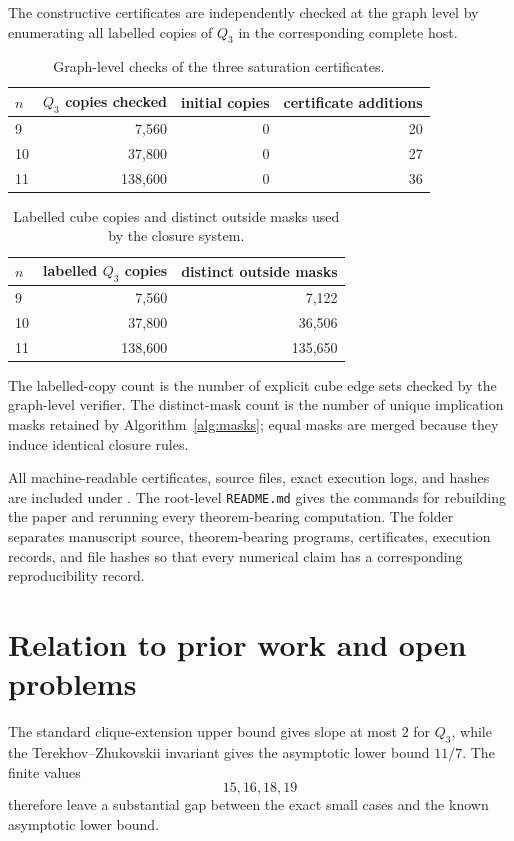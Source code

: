 \documentclass[11pt]{article}
\numberwithin{equation}{section}
\begin{document}
The constructive certificates are independently checked at the graph level by enumerating all labelled copies of $Q_3$ in the corresponding complete host.
\begin{table}[t]
\centering
\caption{Graph-level checks of the three saturation certificates.}
\label{tab:graphcheck}
\begin{tabular}{lrrr}
\toprule
$n$ & $Q_3$ copies checked & initial copies & certificate additions \\
\midrule
9  & 7,560   & 0 & 20 \\
10 & 37,800  & 0 & 27 \\
11 & 138,600 & 0 & 36 \\
\bottomrule
\end{tabular}
\end{table}

\begin{table}[t]
\centering
\caption{Labelled cube copies and distinct outside masks used by the closure system.}
\label{tab:maskcounts}
\begin{tabular}{lrr}
\toprule
$n$ & labelled $Q_3$ copies & distinct outside masks \\
\midrule
9  & 7,560   & 7,122 \\
10 & 37,800  & 36,506 \\
11 & 138,600 & 135,650 \\
\bottomrule
\end{tabular}
\end{table}

The labelled-copy count is the number of explicit cube edge sets checked by
the graph-level verifier. The distinct-mask count is the number of unique
implication masks retained by Algorithm~\ref{alg:masks}; equal masks are
merged because they induce identical closure rules.

All machine-readable certificates, source files, exact execution logs, and hashes are included under . The root-level \texttt{README.md} gives the commands for rebuilding the paper and rerunning every theorem-bearing computation. The folder separates manuscript source, theorem-bearing programs, certificates, execution records, and file hashes so that every numerical claim has a corresponding reproducibility record.

\section{Relation to prior work and open problems}\label{sec:open}
The standard clique-extension upper bound gives slope at most $2$ for $Q_3$, while the Terekhov--Zhukovskii invariant gives the asymptotic lower bound $11/7$. The finite values
\[
15,16,18,19
\]
therefore leave a substantial gap between the exact small cases and the known asymptotic lower bound.
\end{document}

